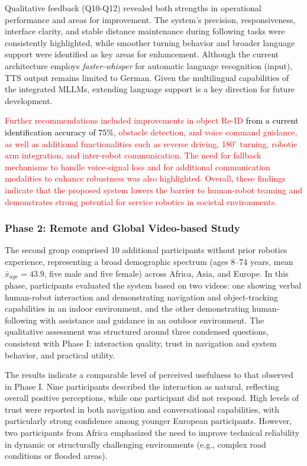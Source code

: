 \documentclass[lettersize,journal]{IEEEtran}
\begin{document}
Qualitative feedback (Q10-Q12) revealed both strengths in operational performance and areas for improvement. The system’s precision, responsiveness, interface clarity, and stable distance maintenance during following tasks were consistently highlighted, while smoother turning behavior and broader language support were identified as key areas for enhancement. Although the current architecture employs \textit{faster-whisper} for automatic language recognition (input), TTS output remains limited to German. Given the multilingual capabilities of the integrated MLLMs, extending language support is a key direction for future development.

\textcolor{red}{
Further recommendations included improvements in object Re-ID \textcolor{black}{from a current  identification accuracy of $75\%$}, obstacle detection, and voice command guidance, as well as additional functionalities such as reverse driving, 180$^\circ$ turning, robotic arm integration, and inter-robot communication. The need for fallback mechanisms to handle voice-signal loss and for additional communication modalities to enhance robustness was also highlighted. Overall, these findings indicate that the proposed system lowers the barrier to human-robot teaming and demonstrates strong potential for service robotics in societal environments.}

\subsubsection{Phase 2: Remote and Global  Video-based Study}
The second group comprised 10 additional participants without prior robotics experience, representing a broad demographic spectrum (ages 8–74 years, mean $\bar{x}_{age} = 43.9$, five male and five female) across Africa, Asia, and Europe. In this phase, participants evaluated the system based on two videos: one showing verbal human-robot interaction and demonstrating navigation and object-tracking capabilities in an indoor environment, and the other demonstrating human-following with assistance and guidance in an outdoor environment. The qualitative assessment was structured around three condensed questions, consistent with Phase I: interaction quality, trust in navigation and system behavior, and practical utility.

The results indicate a comparable level of perceived usefulness to that observed in Phase I. Nine participants described the interaction as natural, reflecting overall positive perceptions, while one participant did not respond. High levels of trust were reported in both navigation and conversational capabilities, with particularly strong confidence among younger European participants. However, two participants from Africa emphasized the need to improve technical reliability in dynamic or structurally challenging environments (e.g., complex road conditions or flooded areas).
\end{document}
